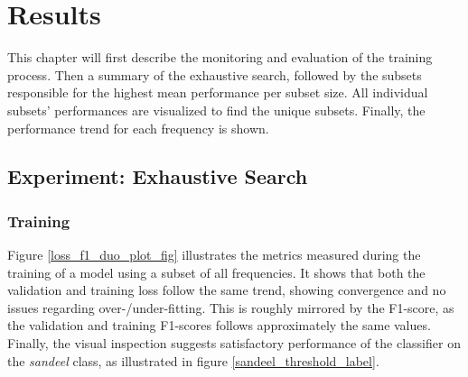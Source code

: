 \chapter{Results} \label{results}
This chapter will first describe the monitoring and evaluation of the training process. Then a summary of the exhaustive search, followed by the subsets responsible for the highest mean performance per subset size. All individual subsets’ performances are visualized to find the unique subsets. Finally, the performance trend for each frequency is shown. 

\section{Experiment: Exhaustive Search}
    
    \subsection{Training}

        
        
    Figure \ref{loss_f1_duo_plot_fig} illustrates the metrics measured during the training of a model using a subset of all frequencies. It shows that both the validation and training loss follow the same trend, showing convergence and no issues regarding over-/under-fitting. This is roughly mirrored by the F1-score, as the validation and training F1-scores follows approximately the same values. Finally, the visual inspection suggests satisfactory performance of the classifier on the \textit{sandeel} class, as illustrated in figure \ref{sandeel_threshold_label}.%
        
